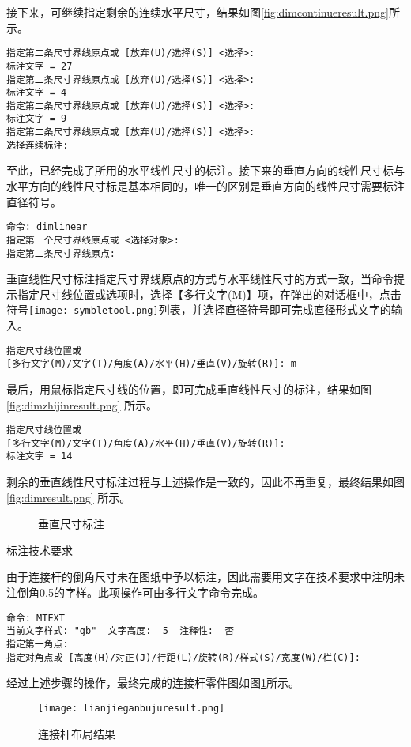 \begin{procedure}
接下来，可继续指定剩余的连续水平尺寸，结果如图\ref{fig:dimcontinueresult.png}所示。
\begin{lstlisting}
指定第二条尺寸界线原点或 [放弃(U)/选择(S)] <选择>:
标注文字 = 27
指定第二条尺寸界线原点或 [放弃(U)/选择(S)] <选择>:
标注文字 = 4
指定第二条尺寸界线原点或 [放弃(U)/选择(S)] <选择>:
标注文字 = 9
指定第二条尺寸界线原点或 [放弃(U)/选择(S)] <选择>:
选择连续标注:
\end{lstlisting}
至此，已经完成了所用的水平线性尺寸的标注。接下来的垂直方向的线性尺寸标与水平方向的线性尺寸标是基本相同的，唯一的区别是垂直方向的线性尺寸需要标注直径符号。
\begin{lstlisting}
命令: dimlinear
指定第一个尺寸界线原点或 <选择对象>:
指定第二条尺寸界线原点:
\end{lstlisting}
垂直线性尺寸标注指定尺寸界线原点的方式与水平线性尺寸的方式一致，当命令提示指定尺寸线位置或选项时，选择【多行文字(M)】项，在弹出的对话框中，点击符号\texttt{[image: symbletool.png]}列表，并选择直径符号即可完成直径形式文字的输入。
\begin{lstlisting}
指定尺寸线位置或
[多行文字(M)/文字(T)/角度(A)/水平(H)/垂直(V)/旋转(R)]: m
\end{lstlisting}
最后，用鼠标指定尺寸线的位置，即可完成重直线性尺寸的标注，结果如图\ref{fig:dimzhijinresult.png} 所示。
\begin{lstlisting}
指定尺寸线位置或
[多行文字(M)/文字(T)/角度(A)/水平(H)/垂直(V)/旋转(R)]:
标注文字 = 14
\end{lstlisting}

剩余的垂直线性尺寸标注过程与上述操作是一致的，因此不再重复，最终结果如图\ref{fig:dimresult.png} 所示。

\begin{figure}[htbp]
\centering
{}\hspace{20pt}
\caption{垂直尺寸标注}
\end{figure}
\item 标注技术要求

由于连接杆的倒角尺寸未在图纸中予以标注，因此需要用文字在技术要求中注明未注倒角0.5的字样。此项操作可由多行文字命令完成。
\begin{lstlisting}
命令: MTEXT
当前文字样式: "gb"  文字高度:  5  注释性:  否
指定第一角点:
指定对角点或 [高度(H)/对正(J)/行距(L)/旋转(R)/样式(S)/宽度(W)/栏(C)]:
\end{lstlisting}
\end{procedure}

经过上述步骤的操作，最终完成的连接杆零件图如图\ref{fig:lianjieganbujuresult.png}所示。
\begin{figure}[htbp]
\centering
\texttt{[image: lianjieganbujuresult.png]}
\caption{连接杆布局结果}\label{fig:lianjieganbujuresult.png}
\end{figure}
\endinput